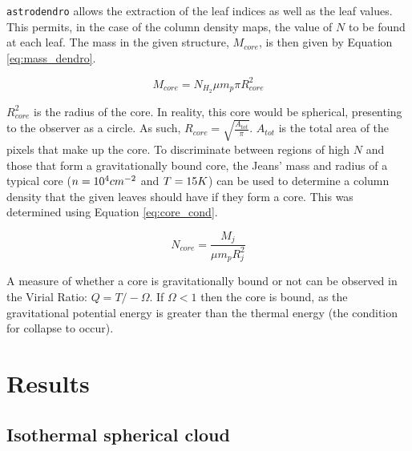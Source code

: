 \documentclass{report}
\begin{document}
\texttt{astrodendro} allows the extraction of the leaf indices as well as the leaf values. This permits, in the case of the column density maps, the value of $N$ to be found at each leaf. The mass in the given structure, $M_{core}$, is then given by Equation \ref{eq:mass_dendro}.

\begin{equation}
  M_{core} = N_{H_{2}}\mu m_{p} \pi R_{core}^{2}
\end{equation} \label{eq:mass_dendro}

$R_{core}^{2}$ is the radius of the core. In reality, this core would be spherical, presenting to the observer as a circle. As such, $R_{core} = \sqrt{\frac{A_{tot}}{\pi}}$. $A_{tot}$ is the total area of the pixels that make up the core. To discriminate between regions of high $N$ and those that form a gravitationally bound core, the Jeans' mass and radius of a typical core ($n = 10^{4}\/cm^{-2}$ and $T=15\/K$) can be used to determine a column density that the given leaves should have if they form a core. This was determined using Equation \ref{eq:core_cond}.

\begin{equation}
  N_{core} = \frac{M_{j}}{\mu m_{p} R_{j}^{2}}
\end{equation} \label{eq:core_cond}

A measure of whether a core is gravitationally bound or not can be observed in the Virial Ratio: $Q = T/-\Omega$. If $\Omega < 1$ then the core is bound, as the gravitational potential energy is greater than the thermal energy (the condition for collapse to occur).


\chapter{Results}

\section{Isothermal spherical cloud} \label{sec:iso}
\end{document}
